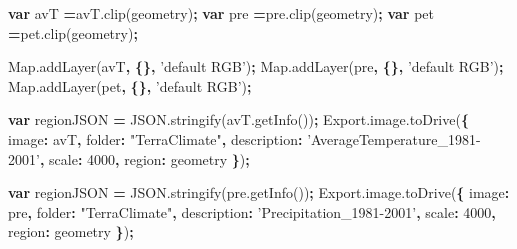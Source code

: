 \documentclass[
  10pt,
  b5paper,
]{book}
\newenvironment{Shaded}{\begin{snugshade}}{\end{snugshade}}
\newcommand{\AttributeTok}[1]{\textcolor[rgb]{0.77,0.63,0.00}{#1}}
\newcommand{\DataTypeTok}[1]{\textcolor[rgb]{0.13,0.29,0.53}{#1}}
\newcommand{\DecValTok}[1]{\textcolor[rgb]{0.00,0.00,0.81}{#1}}
\newcommand{\KeywordTok}[1]{\textcolor[rgb]{0.13,0.29,0.53}{\textbf{#1}}}
\newcommand{\NormalTok}[1]{#1}
\newcommand{\OperatorTok}[1]{\textcolor[rgb]{0.81,0.36,0.00}{\textbf{#1}}}
\newcommand{\StringTok}[1]{\textcolor[rgb]{0.31,0.60,0.02}{#1}}
\newcommand{\VariableTok}[1]{\textcolor[rgb]{0.00,0.00,0.00}{#1}}
\begin{document}
\begin{Shaded}
\begin{Highlighting}[]
\KeywordTok{var}\NormalTok{ avT }\OperatorTok{=}\VariableTok{avT}\NormalTok{.}\AttributeTok{clip}\NormalTok{(geometry)}\OperatorTok{;}
\KeywordTok{var}\NormalTok{ pre }\OperatorTok{=}\VariableTok{pre}\NormalTok{.}\AttributeTok{clip}\NormalTok{(geometry)}\OperatorTok{;}
\KeywordTok{var}\NormalTok{ pet }\OperatorTok{=}\VariableTok{pet}\NormalTok{.}\AttributeTok{clip}\NormalTok{(geometry)}\OperatorTok{;}



\VariableTok{Map}\NormalTok{.}\AttributeTok{addLayer}\NormalTok{(avT}\OperatorTok{,} \OperatorTok{\{\},} \StringTok{'default RGB'}\NormalTok{)}\OperatorTok{;}
\VariableTok{Map}\NormalTok{.}\AttributeTok{addLayer}\NormalTok{(pre}\OperatorTok{,} \OperatorTok{\{\},} \StringTok{'default RGB'}\NormalTok{)}\OperatorTok{;}
\VariableTok{Map}\NormalTok{.}\AttributeTok{addLayer}\NormalTok{(pet}\OperatorTok{,} \OperatorTok{\{\},} \StringTok{'default RGB'}\NormalTok{)}\OperatorTok{;}


\KeywordTok{var}\NormalTok{ regionJSON }\OperatorTok{=} \VariableTok{JSON}\NormalTok{.}\AttributeTok{stringify}\NormalTok{(}\VariableTok{avT}\NormalTok{.}\AttributeTok{getInfo}\NormalTok{())}\OperatorTok{;}
\VariableTok{Export}\NormalTok{.}\VariableTok{image}\NormalTok{.}\AttributeTok{toDrive}\NormalTok{(}\OperatorTok{\{}
          \DataTypeTok{image}\OperatorTok{:}\NormalTok{ avT}\OperatorTok{,}
          \DataTypeTok{folder}\OperatorTok{:} \StringTok{"TerraClimate"}\OperatorTok{,}
          \DataTypeTok{description}\OperatorTok{:} \StringTok{'AverageTemperature_1981-2001'}\OperatorTok{,} 
          \DataTypeTok{scale}\OperatorTok{:} \DecValTok{4000}\OperatorTok{,}
          \DataTypeTok{region}\OperatorTok{:}\NormalTok{ geometry}
\OperatorTok{\}}\NormalTok{)}\OperatorTok{;}

\KeywordTok{var}\NormalTok{ regionJSON }\OperatorTok{=} \VariableTok{JSON}\NormalTok{.}\AttributeTok{stringify}\NormalTok{(}\VariableTok{pre}\NormalTok{.}\AttributeTok{getInfo}\NormalTok{())}\OperatorTok{;}
\VariableTok{Export}\NormalTok{.}\VariableTok{image}\NormalTok{.}\AttributeTok{toDrive}\NormalTok{(}\OperatorTok{\{}
          \DataTypeTok{image}\OperatorTok{:}\NormalTok{ pre}\OperatorTok{,}
          \DataTypeTok{folder}\OperatorTok{:} \StringTok{"TerraClimate"}\OperatorTok{,}
          \DataTypeTok{description}\OperatorTok{:} \StringTok{'Precipitation_1981-2001'}\OperatorTok{,} 
          \DataTypeTok{scale}\OperatorTok{:} \DecValTok{4000}\OperatorTok{,}
          \DataTypeTok{region}\OperatorTok{:}\NormalTok{ geometry}
\OperatorTok{\}}\NormalTok{)}\OperatorTok{;}


\end{Highlighting}
\end{Shaded}
\end{document}
